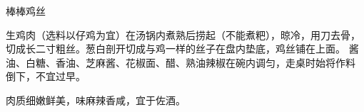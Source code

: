 \begin{recipe}{棒棒鸡丝}

\ingredients


\preparation

\step 生鸡肉（选料以仔鸡为宜）在汤锅内煮熟后捞起（不能煮粑），晾冷，用刀去骨，
切成长二寸粗丝。葱白剖开切成与鸡一样的丝子在盘内垫底，鸡丝铺在上面。
\step 酱油、白糖、香油、芝麻酱、花椒面、醋、熟油辣椒在碗内调匀，走桌时始将作料
倒下，不宜过早。

\features

肉质细嫩鲜美，味麻辣香咸，宜于佐酒。

\end{recipe}

